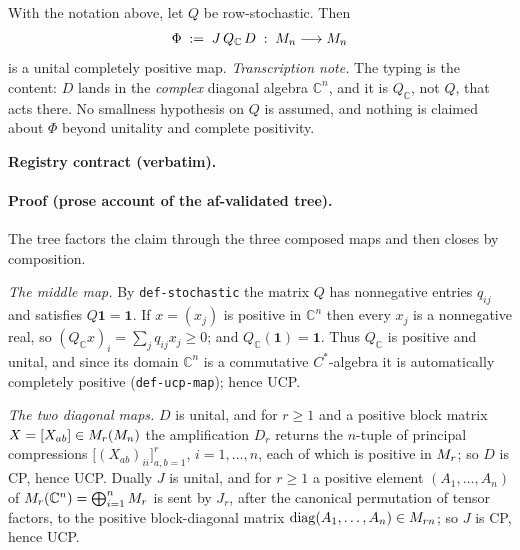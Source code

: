 \begin{lemma}\label{lem:routef-f0-ucp-lift}
With the notation above, let $Q$ be row-stochastic. Then
\begin{equation}\label{eq:f0-phi}
  \Phi\;:=\;J\,Q_{\mathbb C}\,D\;:\;M_{n}\longrightarrow M_{n}
\end{equation}
is a unital completely positive map.
\emph{Transcription note.} The typing is the content: $D$ lands in the \emph{complex}
diagonal algebra $\mathbb C^{n}$, and it is $Q_{\mathbb C}$, not $Q$, that acts there. No
smallness hypothesis on $Q$ is assumed, and nothing is claimed about $\Phi$ beyond
unitality and complete positivity.
\end{lemma}

\noindent\textbf{Registry contract (verbatim).}

\paragraph{Proof (prose account of the af-validated tree).}
The tree factors the claim through the three composed maps and then closes by composition.

\emph{The middle map.} By \texttt{def-stochastic} the matrix $Q$ has nonnegative entries
$q_{ij}$ and satisfies $Q\mathbf 1=\mathbf 1$. If $x=(x_{j})$ is positive in
$\mathbb C^{n}$ then every $x_{j}$ is a nonnegative real, so
$(Q_{\mathbb C}x)_{i}=\sum_{j}q_{ij}x_{j}\ge0$; and $Q_{\mathbb C}(\mathbf 1)=\mathbf 1$.
Thus $Q_{\mathbb C}$ is positive and unital, and since its domain $\mathbb C^{n}$ is a
commutative $C^{*}$-algebra it is automatically completely positive
(\texttt{def-ucp-map}); hence UCP.

\emph{The two diagonal maps.} $D$ is unital, and for $r\ge1$ and a positive block matrix
$X=[X_{ab}]\in M_{r}(M_{n})$ the amplification $D_{r}$ returns the $n$-tuple of principal
compressions $\bigl[(X_{ab})_{ii}\bigr]_{a,b=1}^{r}$, $i=1,\dots,n$, each of which is
positive in $M_{r}$; so $D$ is CP, hence UCP. Dually $J$ is unital, and for $r\ge1$ a
positive element $(A_{1},\dots,A_{n})$ of $M_{r}(\mathbb C^{n})=\bigoplus_{i=1}^{n}M_{r}$
is sent by $J_{r}$, after the canonical permutation of tensor factors, to the positive
block-diagonal matrix $\mathrm{diag}(A_{1},\dots,A_{n})\in M_{rn}$; so $J$ is CP, hence
UCP.

